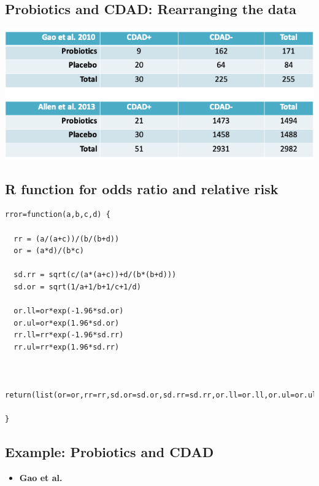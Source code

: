 \documentclass[
]{book}
\providecommand{\tightlist}{%
  \setlength{\itemsep}{0pt}\setlength{\parskip}{0pt}}
\begin{document}
\hypertarget{probiotics-and-cdad-rearranging-the-data}{%
\subsection{Probiotics and CDAD: Rearranging the data}\label{probiotics-and-cdad-rearranging-the-data}}

\includegraphics[width=1\linewidth]{./8_10}

\hypertarget{r-function-for-odds-ratio-and-relative-risk}{%
\subsection{R function for odds ratio and relative risk}\label{r-function-for-odds-ratio-and-relative-risk}}

\begin{verbatim}
rror=function(a,b,c,d) {
  
  rr = (a/(a+c))/(b/(b+d))
  or = (a*d)/(b*c)
  
  sd.rr = sqrt(c/(a*(a+c))+d/(b*(b+d)))
  sd.or = sqrt(1/a+1/b+1/c+1/d)
  
  or.ll=or*exp(-1.96*sd.or)
  or.ul=or*exp(1.96*sd.or)
  rr.ll=rr*exp(-1.96*sd.rr)
  rr.ul=rr*exp(1.96*sd.rr)
  
  
  return(list(or=or,rr=rr,sd.or=sd.or,sd.rr=sd.rr,or.ll=or.ll,or.ul=or.ul,rr.ll=rr.ll,rr.ul=rr.ul))
  
}
\end{verbatim}

\hypertarget{example-probiotics-and-cdad}{%
\subsection{Example: Probiotics and CDAD}\label{example-probiotics-and-cdad}}

\begin{itemize}
\tightlist
\item
  \textbf{Gao et al.}
\end{itemize}
\end{document}
